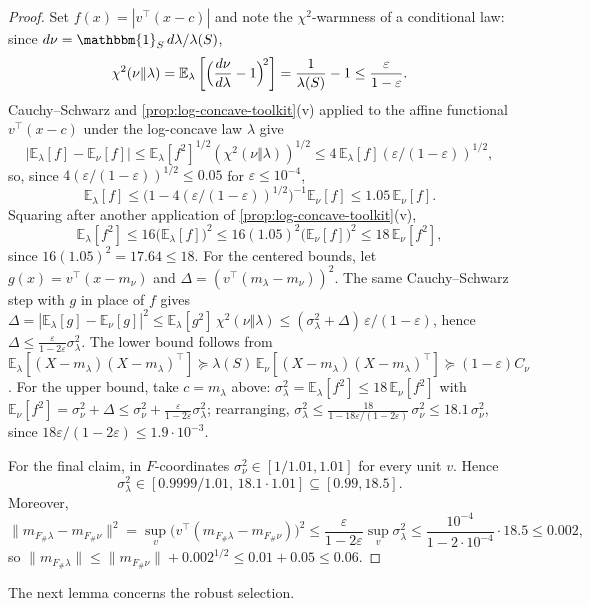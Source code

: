 \documentclass[11pt]{article}
\numberwithin{equation}{section}
\theoremstyle{definition}
\newcommand{\eps}{\varepsilon}
\newcommand{\E}[2]{\mathbb{E}_{#1}\left[#2\right]}
\newcommand{\ind}{\mathbbm{1}}
\begin{document}
\begin{proof}
Set $f(x)=|v^\top(x-c)|$ and note the
$\chi^2$-warmness of a conditional law: since
$d\nu=\ind_S\,d\lambda/\lambda(S)$,
\[
\chi^2(\nu\Vert\lambda)
=\E{\lambda}{\Bigl(\frac{d\nu}{d\lambda}-1\Bigr)^{\!2}}
=\frac{1}{\lambda(S)}-1
\leq\frac{\eps}{1-\eps}.
\]
Cauchy--Schwarz and \cref{prop:log-concave-toolkit}(v) applied to the affine
functional $v^\top(x-c)$ under the log-concave law
$\lambda$ give
\[
\bigl|\E{\lambda}{f}-\E{\nu}{f}\bigr|
\leq\E{\lambda}{f^2}^{1/2}(\chi^2(\nu\Vert\lambda))^{1/2}
\leq4\,\E{\lambda}{f}(\eps/(1-\eps))^{1/2},
\]
so, since $4(\eps/(1-\eps))^{1/2}\leq0.05$ for
$\eps\leq10^{-4}$,
\[
\E{\lambda}{f}
\leq\bigl(1-4(\eps/(1-\eps))^{1/2}\bigr)^{-1}\E{\nu}{f}
\leq1.05\,\E{\nu}{f}.
\]
Squaring after another application of \cref{prop:log-concave-toolkit}(v),
\[
\E{\lambda}{f^2}
\leq16\bigl(\E{\lambda}{f}\bigr)^2
\leq16(1.05)^2\bigl(\E{\nu}{f}\bigr)^2
\leq18\,\E{\nu}{f^2},
\]
since $16(1.05)^2=17.64\leq18$.
For the centered bounds, let $g(x)=v^\top(x-m_\nu)$ and
$\Delta=(v^\top(m_\lambda-m_\nu))^2$.
The same Cauchy--Schwarz step with $g$ in place of
$f$ gives
$\Delta=|\E{\lambda}{g}-\E{\nu}{g}|^2 \leq\E{\lambda}{g^2}\,\chi^2(\nu\Vert\lambda) \leq(\sigma_\lambda^2+\Delta)\,\eps/(1-\eps)$,
hence
$\Delta\leq\frac{\eps}{1-2\eps}\sigma_\lambda^2$.
The lower bound follows from
$\E{\lambda}{(X-m_\lambda)(X-m_\lambda)^\top} \succeq\lambda(S)\,\E{\nu}{(X-m_\lambda)(X-m_\lambda)^\top} \succeq(1-\eps)C_\nu$.
For the upper bound, take $c=m_\lambda$ above:
$\sigma_\lambda^2=\E{\lambda}{f^2}\leq18\,\E{\nu}{f^2}$ with
$\E{\nu}{f^2}=\sigma_\nu^2+\Delta \leq\sigma_\nu^2+\frac{\eps}{1-2\eps}\sigma_\lambda^2$;
rearranging,
$\sigma_\lambda^2 \leq\frac{18}{1-18\eps/(1-2\eps)}\,\sigma_\nu^2 \leq18.1\,\sigma_\nu^2$,
since
$18\eps/(1-2\eps)\leq1.9\cdot10^{-3}$.

For the final claim, in $F$-coordinates
$\sigma_\nu^2\in[1/1.01,1.01]$ for every unit
$v$. Hence
\[
\sigma_\lambda^2\in[0.9999/1.01,\,18.1\cdot1.01]
\subseteq[0.99,18.5].
\]
Moreover,
\[
\|m_{F_\#\lambda}-m_{F_\#\nu}\|^2
=\sup_v\bigl(v^\top(m_{F_\#\lambda}-m_{F_\#\nu})\bigr)^2
\leq\frac{\eps}{1-2\eps}\sup_v\sigma_\lambda^2
\leq\frac{10^{-4}}{1-2\cdot10^{-4}}\cdot18.5
\leq0.002,
\]
so $\|m_{F_\#\lambda}\|\leq\|m_{F_\#\nu}\|+0.002^{1/2} \leq0.01+0.05\leq0.06$.
\end{proof}

The next lemma concerns the robust selection.
\end{document}
